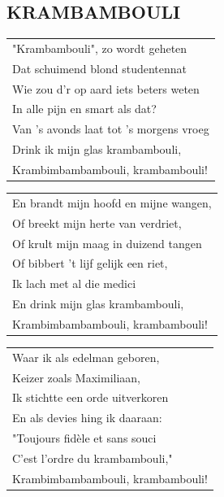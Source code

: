 \documentclass[a4paper, 14pt]{extarticle}
\begin{document}
\subsection*{KRAMBAMBOULI}
\begin{flushleft}
\begin{tabularx}{0.8\textwidth} {
   >{\raggedright\arraybackslash}X}
   "Krambambouli", zo wordt geheten\\
Dat schuimend blond studentennat\\
Wie zou d’r op aard iets beters weten\\
In alle pijn en smart als dat?\\
Van ’s avonds laat tot ’s morgens vroeg\\
Drink ik mijn glas krambambouli,\\
Krambimbambambouli, krambambouli!\\
\end{tabularx}
\end{flushleft}\begin{flushleft}
\begin{tabularx}{0.8\textwidth} {
   >{\raggedright\arraybackslash}X}
En brandt mijn hoofd en mijne wangen,\\
Of breekt mijn herte van verdriet,\\
Of krult mijn maag in duizend tangen\\
Of bibbert ’t lijf gelijk een riet,\\
Ik lach met al die medici\\
En drink mijn glas krambambouli,\\
Krambimbambambouli, krambambouli!\\
\end{tabularx}
\end{flushleft}\begin{flushleft}
\begin{tabularx}{0.8\textwidth} {
   >{\raggedright\arraybackslash}X}
Waar ik als edelman geboren,\\
Keizer zoals Maximiliaan,\\
Ik stichtte een orde uitverkoren\\
En als devies hing ik daaraan:\\
"Toujours fidèle et sans souci\\
C’est l’ordre du krambambouli,"\\
Krambimbambambouli, krambambouli!\\
\end{tabularx}
\end{flushleft}\begin{flushleft}

\end{flushleft}
\end{document}
